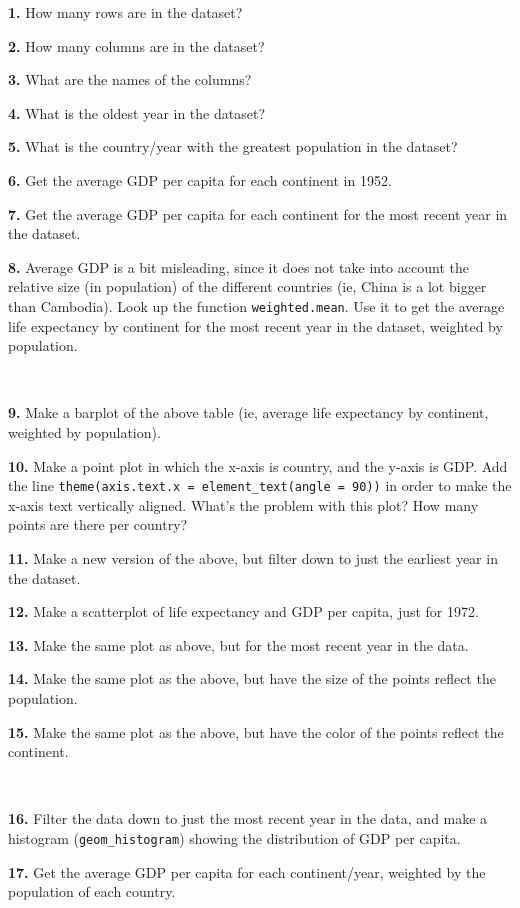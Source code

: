 \documentclass[]{book}
\begin{document}
\textbf{1.} How many rows are in the dataset?

\textbf{2.} How many columns are in the dataset?

\textbf{3.} What are the names of the columns?

\textbf{4.} What is the oldest year in the dataset?

\textbf{5.} What is the country/year with the greatest population in the dataset?

\textbf{6.} Get the average GDP per capita for each continent in 1952.

\textbf{7.} Get the average GDP per capita for each continent for the most recent year in the dataset.

\textbf{8.} Average GDP is a bit misleading, since it does not take into account the relative size (in population) of the different countries (ie, China is a lot bigger than Cambodia). Look up the function \texttt{weighted.mean}. Use it to get the average life expectancy by continent for the most recent year in the dataset, weighted by population.

~

\textbf{9.} Make a barplot of the above table (ie, average life expectancy by continent, weighted by population).

\textbf{10.} Make a point plot in which the x-axis is country, and the y-axis is GDP. Add the line \texttt{theme(axis.text.x\ =\ element\_text(angle\ =\ 90))} in order to make the x-axis text vertically aligned. What's the problem with this plot? How many points are there per country?

\textbf{11.} Make a new version of the above, but filter down to just the earliest year in the dataset.

\textbf{12.} Make a scatterplot of life expectancy and GDP per capita, just for 1972.

\textbf{13.} Make the same plot as above, but for the most recent year in the data.

\textbf{14.} Make the same plot as the above, but have the size of the points reflect the population.

\textbf{15.} Make the same plot as the above, but have the color of the points reflect the continent.

~

\textbf{16.} Filter the data down to just the most recent year in the data, and make a histogram (\texttt{geom\_histogram}) showing the distribution of GDP per capita.

\textbf{17.} Get the average GDP per capita for each continent/year, weighted by the population of each country.
\end{document}
